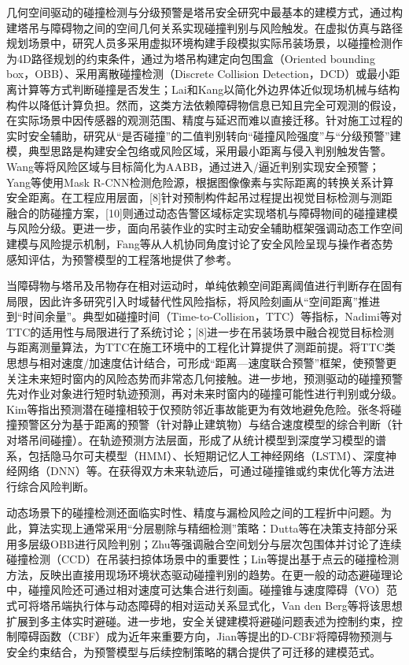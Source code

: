 几何空间驱动的碰撞检测与分级预警是塔吊安全研究中最基本的建模方式，通过构建塔吊与障碍物之间的空间几何关系实现碰撞判别与风险触发。在虚拟仿真与路径规划场景中，研究人员多采用虚拟环境构建手段模拟实际吊装场景，以碰撞检测作为4D路径规划的约束条件\cite{KAVTM3MI}，通过为塔吊构建定向包围盒（Oriented bounding box，OBB）\cite{6SVWRM5Y}、采用离散碰撞检测（Discrete Collision Detection，DCD）\cite{HZ3G3PMB,3T2HAT9Q}或最小距离计算\cite{8FRKDLAT}等方式判断碰撞是否发生；Lai和Kang\cite{39QNQEMU}以简化外边界体近似现场机械与结构构件以降低计算负担。然而，这类方法依赖障碍物信息已知且完全可观测的假设，在实际场景中因传感器的观测范围、精度与延迟而难以直接迁移。针对施工过程的实时安全辅助，研究从“是否碰撞”的二值判别转向“碰撞风险强度”与“分级预警”建模，典型思路是构建安全包络或风险区域，采用最小距离与侵入判别触发告警\cite{KF34Y86G}。Wang等\cite{5JE9BPJQ}将风险区域与目标简化为AABB，通过进入/逼近判别实现安全预警；Yang等\cite{8FY5FXQ3}使用Mask R-CNN检测危险源，根据图像像素与实际距离的转换关系计算安全距离。在工程应用层面，[8]针对预制构件起吊过程提出视觉目标检测与测距融合的防碰撞方案，[10]则通过动态告警区域标定实现塔机与障碍物间的碰撞建模与风险分级。更进一步，面向吊装作业的实时主动安全辅助框架强调动态工作空间建模与风险提示机制\cite{K9J9CXIH}，Fang等\cite{FWEHHUWL}从人机协同角度讨论了安全风险呈现与操作者态势感知评估，为预警模型的工程落地提供了参考。

当障碍物与塔吊及吊物存在相对运动时，单纯依赖空间距离阈值进行判断存在固有局限，因此许多研究引入时域替代性风险指标，将风险刻画从“空间距离”推进到“时间余量”。典型如碰撞时间（Time-to-Collision，TTC）等指标，Nadimi等\cite{MAG8XRJ5}对TTC的适用性与局限进行了系统讨论；[8]进一步在吊装场景中融合视觉目标检测与距离测量算法，为TTC在施工环境中的工程化计算提供了测距前提。将TTC类思想与相对速度/加速度估计结合，可形成“距离—速度联合预警”框架，使预警更关注未来短时窗内的风险态势而非常态几何接触。进一步地，预测驱动的碰撞预警先对作业对象进行短时轨迹预测，再对未来时窗内的碰撞可能性进行判别或分级。Kim等\cite{XULW2BE3}指出预测潜在碰撞相较于仅预防邻近事故能更为有效地避免危险。张冬\cite{3FJ56MZB}将碰撞预警区分为基于距离的预警（针对静止建筑物）与结合速度模型的综合判断（针对塔吊间碰撞）。在轨迹预测方法层面，形成了从统计模型到深度学习模型的谱系，包括隐马尔可夫模型（HMM）\cite{TC4V9RAC}、长短期记忆人工神经网络（LSTM）\cite{HRDHH5IM}、深度神经网络（DNN）\cite{TF9IX4KK}等。在获得双方未来轨迹后，可通过碰撞锥\cite{UHXM7SNP,BHEQBQYN}或约束优化\cite{UYMXPTM6}等方法进行综合风险判断。

动态场景下的碰撞检测还面临实时性、精度与漏检风险之间的工程折中问题。为此，算法实现上通常采用“分层剔除与精细检测”策略：Dutta等\cite{HZ3G3PMB}在决策支持部分采用多层级OBB进行风险判别；Zhu等\cite{YMH5BX8M}强调融合空间划分与层次包围体并讨论了连续碰撞检测（CCD）在吊装扫掠体场景中的重要性；Lin等\cite{97BJ5NLW}提出基于点云的碰撞检测方法，反映出直接用现场环境状态驱动碰撞判别的趋势。在更一般的动态避碰理论中，碰撞风险还可通过相对速度可达集合进行刻画。碰撞锥与速度障碍（VO）范式可将塔吊端执行体与动态障碍的相对运动关系显式化\cite{BZUL7ZKB}，Van den Berg等\cite{25CQDW8W}将该思想扩展到多主体实时避碰。进一步地，安全关键建模将避碰问题表述为控制约束，控制障碍函数（CBF）成为近年来重要方向，Jian等\cite{QG5TNYGE}提出的D-CBF将障碍物预测与安全约束结合，为预警模型与后续控制策略的耦合提供了可迁移的建模范式。

